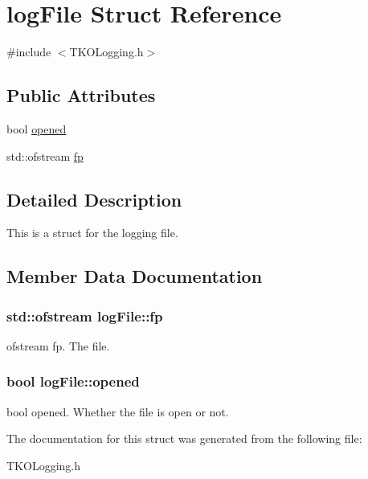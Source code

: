 \hypertarget{structlog_file}{\section{log\-File Struct Reference}
\label{structlog_file}
}


{\ttfamily \#include $<$T\-K\-O\-Logging.\-h$>$}

\subsection*{Public Attributes}
\begin{DoxyCompactItemize}
\item 
bool \hyperlink{structlog_file_a4a069d00b4f684751ecba0c9625eeae6}{opened}
\item 
std\-::ofstream \hyperlink{structlog_file_a78d1ffa2264f3fcb04177e06803a9426}{fp}
\end{DoxyCompactItemize}


\subsection{Detailed Description}
This is a struct for the logging file. 

\subsection{Member Data Documentation}
\hypertarget{structlog_file_a78d1ffa2264f3fcb04177e06803a9426}{
\subsubsection[{fp}]{\setlength{\rightskip}{0pt plus 5cm}std\-::ofstream log\-File\-::fp}}\label{structlog_file_a78d1ffa2264f3fcb04177e06803a9426}
ofstream fp. The file. \hypertarget{structlog_file_a4a069d00b4f684751ecba0c9625eeae6}{
\subsubsection[{opened}]{\setlength{\rightskip}{0pt plus 5cm}bool log\-File\-::opened}}\label{structlog_file_a4a069d00b4f684751ecba0c9625eeae6}
bool opened. Whether the file is open or not. 

The documentation for this struct was generated from the following file\-:\begin{DoxyCompactItemize}
\item 
T\-K\-O\-Logging.\-h\end{DoxyCompactItemize}
